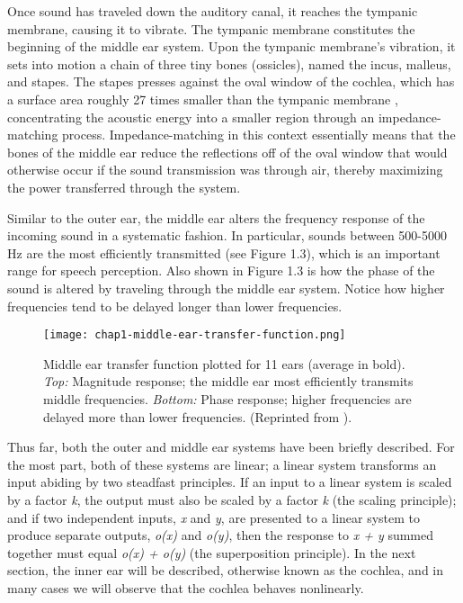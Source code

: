 Once sound has traveled down the auditory canal, it reaches the tympanic membrane, causing it to vibrate.  The tympanic membrane constitutes the beginning of the middle ear system.  Upon the tympanic membrane's vibration, it sets into motion a chain of three tiny bones (ossicles), named the incus, malleus, and stapes.  The stapes presses against the oval window of the cochlea, which has a surface area roughly 27 times smaller than the tympanic membrane \cite{Moore2007}, concentrating the acoustic energy into a smaller region through an impedance-matching process.  Impedance-matching in this context essentially means that the bones of the middle ear reduce the reflections off of the oval window that would otherwise occur if the sound transmission was through air, thereby maximizing the power transferred through the system.

Similar to the outer ear, the middle ear alters the frequency response of the incoming sound in a systematic fashion.  In particular, sounds between 500-5000 Hz are the most efficiently transmitted (see Figure 1.3), which is an important range for speech perception.  Also shown in Figure 1.3 is how the phase of the sound is altered by traveling through the middle ear system.  Notice how higher frequencies tend to be delayed longer than lower frequencies.

\begin{figure}[htbp]
\begin{center}
\texttt{[image: chap1-middle-ear-transfer-function.png]} \\
\caption[Middle ear transfer function]{Middle ear transfer function plotted for 11 ears (average in bold).  \emph{Top:} Magnitude response; the middle ear most efficiently transmits middle frequencies.  \emph{Bottom:} Phase response; higher frequencies are delayed more than lower frequencies.  (Reprinted from ).}
\label{middle-tf}
\end{center}
\end{figure}

Thus far, both the outer and middle ear systems have been briefly described.  For the most part, both of these systems are linear; a linear system transforms an input abiding by two steadfast principles.  If an input to a linear system is scaled by a factor \emph{k}, the output must also be scaled by a factor \emph{k} (the scaling principle); and if two independent inputs, \emph{x} and \emph{y}, are presented to a linear system to produce separate outputs, \emph{o(x)} and \emph{o(y)}, then the response to \emph{x + y} summed together must equal \emph{o(x) + o(y)} (the superposition principle).  In the next section, the inner ear will be described, otherwise known as the cochlea, and in many cases we will observe that the cochlea behaves nonlinearly.

